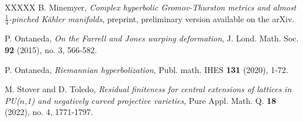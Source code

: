 \documentclass[10pt]{amsart}
\theoremstyle{definition}
\theoremstyle{remark}
\numberwithin{equation}{section}
\begin{document}
\begin{thebibliography}{XXXXX}
 B. Minemyer, \textit{Complex hyperbolic Gromov-Thurston metrics and almost $\frac{1}{4}$-pinched K\"{a}hler manifolds}, preprint, preliminary version available on the arXiv.

 P. Ontaneda, \textit{On the Farrell and Jones warping deformation},
J. Lond. Math. Soc. {\bf 92} (2015), no. 3, 566-582.

 P. Ontaneda, \textit{Riemannian hyperbolization}, Publ. math. IHES {\bf 131} (2020), 1-72. 

 M. Stover and D. Toledo, \textit{Residual finiteness for central extensions of lattices in PU($n$,1) and negatively curved projective varieties}, Pure Appl. Math. Q. {\bf 18} (2022), no. 4, 1771-1797.



\end{thebibliography}
\end{document}
